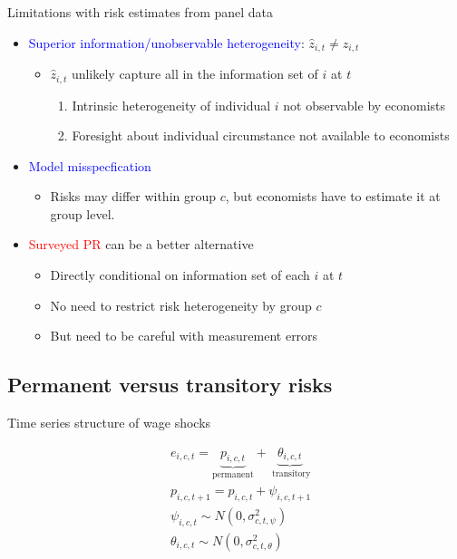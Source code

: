 \documentclass{beamer}
\begin{document}
\begin{frame}{Limitations with risk estimates from panel data}
	\begin{itemize}
		\item \textcolor{blue}{Superior information/unobservable heterogeneity}: $\hat z_{i,t} \neq z_{i,t}$ 
		\begin{itemize}
			\item $\hat z_{i,t}$ unlikely capture all in the information set of $i$ at $t$
		\begin{enumerate}
		\item Intrinsic heterogeneity of individual $i$ not observable by economists 
			\item Foresight about individual circumstance not available to economists
		\end{enumerate}
		\end{itemize}
	\pause
	\item \textcolor{blue}{Model misspecfication}
	\begin{itemize}
		\item Risks may differ within group $c$, but economists have to estimate it at group level.
	\end{itemize}
	\pause
\item \textcolor{red}{Surveyed PR} can be a better alternative 
\begin{itemize}
	\item Directly conditional on information set of each $i$ at $t$
	\item No need to restrict risk heterogeneity by group $c$
	\item But need to be careful with measurement errors 
\end{itemize}
	\end{itemize}	
\end{frame}



\subsection{Permanent  versus transitory risks}


\begin{frame}{Time series structure of wage shocks}

\begin{equation*}
	\begin{split}
& e_{i,c,t} = \underbrace{p_{i,c,t}}_{\text{permanent}} + \underbrace{\theta_{i,c,t}}_{\text{ transitory}} \\
& p_{i,c,t+1} = p_{i,c,t} + \psi_{i,c,t+1} \\
& \psi_{i,c,t} \sim N(0,\sigma^2_{c,t,\psi}) \\
 & \theta_{i,c,t} \sim N(0,\sigma^2_{c,t,\theta}) \\
\end{split} 
	\end{equation*}
\end{frame}
\end{document}
